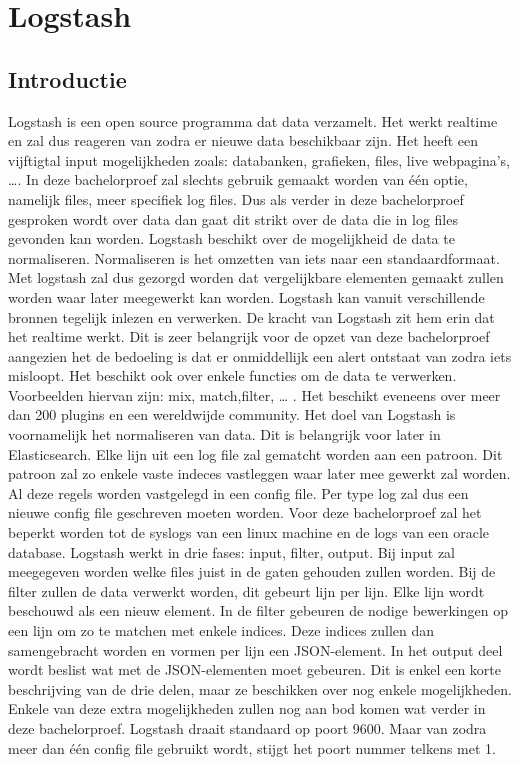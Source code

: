 
\chapter{Logstash}
\label{ch:logstash}


\section{Introductie}
\label{sec:logstash-introductie}

Logstash is een open source programma dat data verzamelt. Het werkt realtime en zal dus reageren van zodra er nieuwe data beschikbaar zijn. Het heeft een vijftigtal input mogelijkheden zoals: databanken, grafieken, files, live webpagina's, \dots. In deze bachelorproef zal slechts gebruik gemaakt worden van één optie, namelijk files, meer specifiek log files. Dus als verder in deze bachelorproef gesproken wordt over data dan gaat dit strikt over de data die in log files gevonden kan worden.
Logstash beschikt over de mogelijkheid de data te normaliseren. Normaliseren is het omzetten van iets naar een standaardformaat. Met logstash zal dus gezorgd worden dat vergelijkbare elementen gemaakt zullen worden waar later meegewerkt kan worden.
Logstash kan vanuit verschillende bronnen tegelijk inlezen en verwerken. 
De kracht van Logstash zit hem erin dat het realtime werkt. Dit is zeer belangrijk voor de opzet van deze bachelorproef aangezien het de bedoeling is dat er onmiddellijk een alert ontstaat van zodra iets misloopt. Het beschikt ook over enkele functies om de data te verwerken. Voorbeelden hiervan zijn: mix, match,filter, … .  
Het beschikt eveneens over meer dan 200 plugins en een wereldwijde community.
Het doel van Logstash is voornamelijk het normaliseren van data. Dit is belangrijk voor later in Elasticsearch. Elke lijn uit een log file zal gematcht worden aan een patroon. Dit patroon zal zo enkele vaste indeces vastleggen waar later mee gewerkt zal worden.
Al deze regels worden vastgelegd in een config file. Per type log zal dus een nieuwe config file geschreven moeten worden. Voor deze bachelorproef zal het beperkt worden tot de syslogs van een linux machine en de logs van een oracle database.
Logstash werkt in drie fases: input, filter, output. Bij input zal meegegeven worden welke files juist in de gaten gehouden zullen worden. Bij de filter zullen de data verwerkt worden, dit gebeurt lijn per lijn. Elke lijn wordt beschouwd als een nieuw element. In de filter gebeuren de nodige bewerkingen op een lijn om zo te matchen met enkele indices. Deze indices zullen dan samengebracht worden en vormen per lijn een JSON-element. In het output deel wordt beslist wat met de JSON-elementen moet gebeuren.  
Dit is enkel een korte beschrijving van de drie delen, maar ze beschikken over nog enkele mogelijkheden. Enkele van deze extra mogelijkheden zullen nog aan bod komen wat verder in deze bachelorproef. 
Logstash draait standaard op poort 9600. Maar van zodra meer dan één config file gebruikt wordt, stijgt het poort nummer telkens met 1. 



